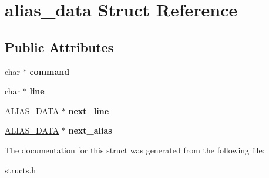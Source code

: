 \hypertarget{structalias__data}{\section{alias\-\_\-data Struct Reference}
\label{structalias__data}
}
\subsection*{Public Attributes}
\begin{DoxyCompactItemize}
\item 
\hypertarget{structalias__data_aacc66e9add04da6d9cf229bc4096f8b2}{char $\ast$ {\bfseries command}}\label{structalias__data_aacc66e9add04da6d9cf229bc4096f8b2}

\item 
\hypertarget{structalias__data_a2f7beff3bfaffb4d5db211fe31046ab3}{char $\ast$ {\bfseries line}}\label{structalias__data_a2f7beff3bfaffb4d5db211fe31046ab3}

\item 
\hypertarget{structalias__data_a896cbb452e23a405fa4314864f29bfcb}{\hyperlink{structalias__data}{A\-L\-I\-A\-S\-\_\-\-D\-A\-T\-A} $\ast$ {\bfseries next\-\_\-line}}\label{structalias__data_a896cbb452e23a405fa4314864f29bfcb}

\item 
\hypertarget{structalias__data_a24281405b5307efa5c6eb370159bcfbc}{\hyperlink{structalias__data}{A\-L\-I\-A\-S\-\_\-\-D\-A\-T\-A} $\ast$ {\bfseries next\-\_\-alias}}\label{structalias__data_a24281405b5307efa5c6eb370159bcfbc}

\end{DoxyCompactItemize}


The documentation for this struct was generated from the following file\-:\begin{DoxyCompactItemize}
\item 
structs.\-h\end{DoxyCompactItemize}
